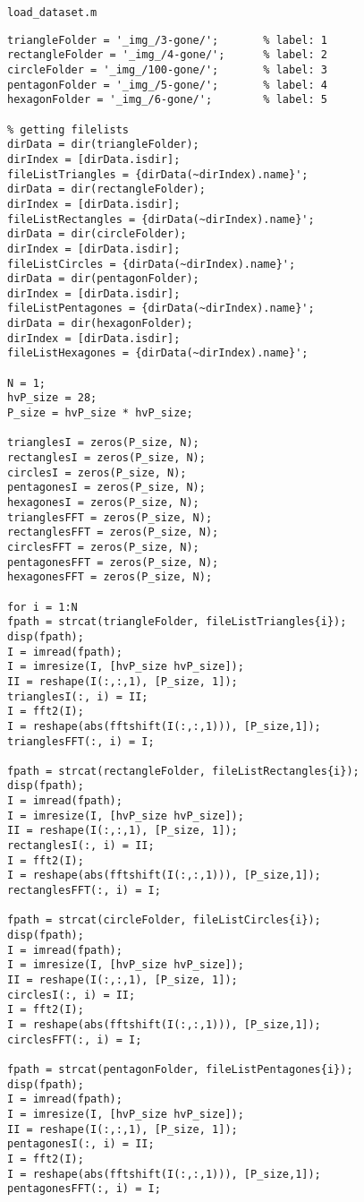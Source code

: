 \documentclass[12pt,a4paper]{article}
\begin{document}
\noindent
\verb|load_dataset.m|
\begin{lstlisting}
triangleFolder = '_img_/3-gone/';       % label: 1
rectangleFolder = '_img_/4-gone/';      % label: 2
circleFolder = '_img_/100-gone/';       % label: 3
pentagonFolder = '_img_/5-gone/';       % label: 4
hexagonFolder = '_img_/6-gone/';        % label: 5

% getting filelists 
dirData = dir(triangleFolder);
dirIndex = [dirData.isdir];
fileListTriangles = {dirData(~dirIndex).name}';
dirData = dir(rectangleFolder);
dirIndex = [dirData.isdir];
fileListRectangles = {dirData(~dirIndex).name}';
dirData = dir(circleFolder);
dirIndex = [dirData.isdir];
fileListCircles = {dirData(~dirIndex).name}';
dirData = dir(pentagonFolder);
dirIndex = [dirData.isdir];
fileListPentagones = {dirData(~dirIndex).name}';
dirData = dir(hexagonFolder);
dirIndex = [dirData.isdir];
fileListHexagones = {dirData(~dirIndex).name}';

N = 1;
hvP_size = 28;
P_size = hvP_size * hvP_size;

trianglesI = zeros(P_size, N);
rectanglesI = zeros(P_size, N);
circlesI = zeros(P_size, N);
pentagonesI = zeros(P_size, N);
hexagonesI = zeros(P_size, N);
trianglesFFT = zeros(P_size, N);
rectanglesFFT = zeros(P_size, N);
circlesFFT = zeros(P_size, N);
pentagonesFFT = zeros(P_size, N);
hexagonesFFT = zeros(P_size, N);

for i = 1:N
fpath = strcat(triangleFolder, fileListTriangles{i});
disp(fpath);
I = imread(fpath);
I = imresize(I, [hvP_size hvP_size]);
II = reshape(I(:,:,1), [P_size, 1]);    
trianglesI(:, i) = II;
I = fft2(I);
I = reshape(abs(fftshift(I(:,:,1))), [P_size,1]);
trianglesFFT(:, i) = I;

fpath = strcat(rectangleFolder, fileListRectangles{i});
disp(fpath);
I = imread(fpath);
I = imresize(I, [hvP_size hvP_size]);
II = reshape(I(:,:,1), [P_size, 1]);
rectanglesI(:, i) = II;
I = fft2(I);
I = reshape(abs(fftshift(I(:,:,1))), [P_size,1]);
rectanglesFFT(:, i) = I;

fpath = strcat(circleFolder, fileListCircles{i});
disp(fpath);
I = imread(fpath);
I = imresize(I, [hvP_size hvP_size]);
II = reshape(I(:,:,1), [P_size, 1]);
circlesI(:, i) = II;
I = fft2(I);
I = reshape(abs(fftshift(I(:,:,1))), [P_size,1]);
circlesFFT(:, i) = I;

fpath = strcat(pentagonFolder, fileListPentagones{i});
disp(fpath);
I = imread(fpath);
I = imresize(I, [hvP_size hvP_size]);
II = reshape(I(:,:,1), [P_size, 1]);
pentagonesI(:, i) = II;
I = fft2(I);
I = reshape(abs(fftshift(I(:,:,1))), [P_size,1]);
pentagonesFFT(:, i) = I;


\end{lstlisting}
\end{document}
